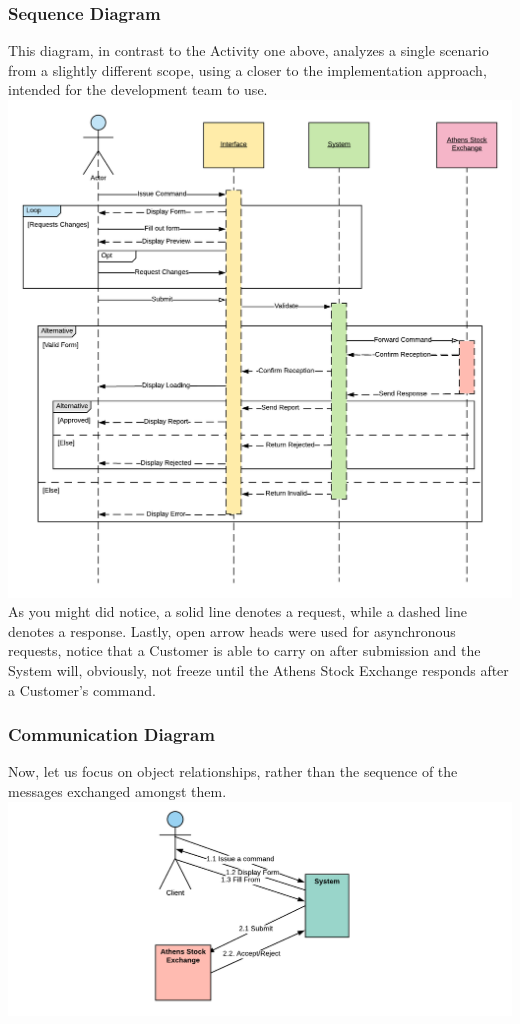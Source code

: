 \documentclass{article}
\begin{document}
\hypertarget{Asynchronous}{\subsubsection{Sequence Diagram}}
This diagram, in contrast to the Activity one above, analyzes a single scenario from a slightly different scope, using a closer to the implementation approach, intended for the development team to use.\\ 
\includegraphics[scale=0.25]{sequence}\\
As you might did notice, a solid line denotes a request, while a dashed line denotes a response. Lastly, open arrow heads were used for asynchronous requests, notice that a Customer is able to carry on after submission and the System will, obviously, not freeze until the Athens Stock Exchange responds after a Customer's command.

\subsubsection{Communication Diagram}
Now, let us focus on object relationships, rather than the sequence of the messages exchanged amongst them.\\
\includegraphics[scale=0.7]{communication}\\
\end{document}
